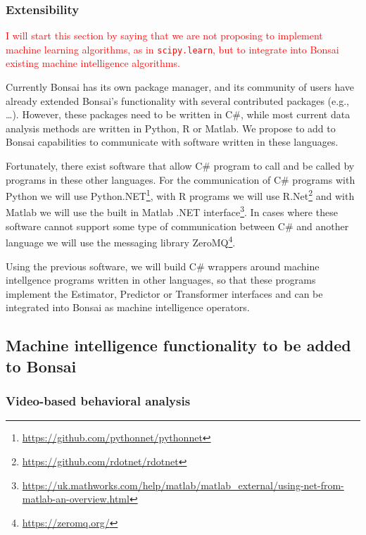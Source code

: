 \documentclass[a4paper,11point]{article}
\begin{document}

\subsubsection{Extensibility}

\textcolor{red}{I will start this section by saying that we are not proposing
to implement machine learning algorithms, as in \texttt{scipy.learn}, but to
integrate into Bonsai existing machine intelligence algorithms.}

Currently Bonsai has its own package manager, and its community of users have
already extended Bonsai's functionality with several contributed packages
(e.g., \ldots). However, these packages need to be written in C\#, while most
current data analysis methods are written in Python, R or Matlab. We propose to
add to Bonsai capabilities to communicate with software written in these
languages.

Fortunately, there exist software that allow C\# program
to call and be called by programs in these other languages. For the
communication of C\# programs with Python we will use
Python.NET\footnote{\href{https://github.com/pythonnet/pythonnet}{https://github.com/pythonnet/pythonnet}},
with R programs we will use
R.Net\footnote{\href{https://github.com/rdotnet/rdotnet}{https://github.com/rdotnet/rdotnet}}
and with Matlab we will use the built in Matlab .NET
interface\footnote{\href{https://uk.mathworks.com/help/matlab/matlab\_external/using-net-from-matlab-an-overview.html}{https://uk.mathworks.com/help/matlab/matlab\_external/using-net-from-matlab-an-overview.html}}.
In cases where these software cannot support some type of communication between
C\# and another language we will use the messaging library
ZeroMQ\footnote{\href{https://zeromq.org/}{https://zeromq.org/}}.

Using the previous software, we will build C\# wrappers around machine
intellgence programs written in other languages, so that these programs
implement the Estimator, Predictor or Transformer interfaces and can be
integrated into Bonsai as machine intelligence operators.

\subsection{Machine intelligence functionality to be added to Bonsai}
\label{sec:toBeAddedMachineIntelligenceFunctionality}

\subsubsection{Video-based behavioral analysis}
\label{sec:videoBasedBehavioralAnalysis}
\end{document}
